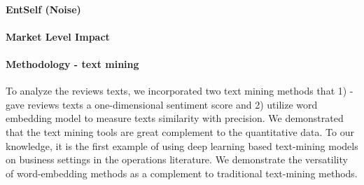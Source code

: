 \documentclass[msom,blindrev]{informs3}
\begin{document}
\paragraph{EntSelf (Noise)}

\paragraph{Market Level Impact}

\paragraph{Methodology - text mining} To analyze the reviews texts, we incorporated two text mining methods that 1) - gave reviews texts a one-dimensional sentiment score and 2) utilize word embedding model to measure texts similarity with precision. We demonstrated that the text mining tools are great complement to the quantitative data. To our knowledge, it is the first example of using deep learning based text-mining models on business settings in the operations literature. We demonstrate the versatility of word-embedding methods as a complement to traditional text-mining methods.
\end{document}
